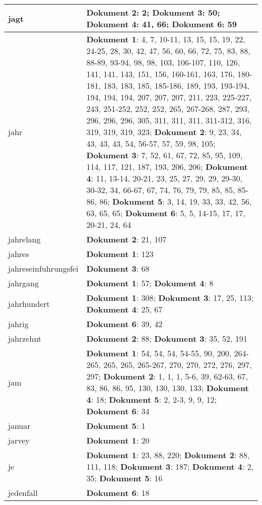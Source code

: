 \documentclass[a5paper]{article}
\begin{document}
\begin{longtable}[l]{|l|p{3in}|}
\hline
jagt & \textbf{Dokument 2}: 2; \textbf{Dokument 3}: 50; \textbf{Dokument 4}: 41, 66; \textbf{Dokument 6}: 59 \\
\hline
jahr & \textbf{Dokument 1}: 4, 7, 10-11, 13, 15, 15, 19, 22, 24-25, 28, 30, 42, 47, 56, 60, 66, 72, 75, 83, 88, 88-89, 93-94, 98, 98, 103, 106-107, 110, 126, 141, 141, 143, 151, 156, 160-161, 163, 176, 180-181, 183, 183, 185, 185-186, 189, 193, 193-194, 194, 194, 194, 207, 207, 207, 211, 223, 225-227, 243, 251-252, 252, 252, 265, 267-268, 287, 293, 296, 296, 296, 305, 311, 311, 311, 311-312, 316, 319, 319, 319, 323; \textbf{Dokument 2}: 9, 23, 34, 43, 43, 43, 54, 56-57, 57, 59, 98, 105; \textbf{Dokument 3}: 7, 52, 61, 67, 72, 85, 95, 109, 114, 117, 121, 187, 193, 206, 206; \textbf{Dokument 4}: 11, 13-14, 20-21, 23, 25, 27, 29, 29, 29-30, 30-32, 34, 66-67, 67, 74, 76, 79, 79, 85, 85, 85-86, 86; \textbf{Dokument 5}: 3, 14, 19, 33, 33, 42, 56, 63, 65, 65; \textbf{Dokument 6}: 5, 5, 14-15, 17, 17, 20-21, 24, 64 \\
\hline
jahrelang & \textbf{Dokument 2}: 21, 107 \\
\hline
jahres & \textbf{Dokument 1}: 123 \\
\hline
jahreseinfuhrungsfei & \textbf{Dokument 3}: 68 \\
\hline
jahrgang & \textbf{Dokument 1}: 57; \textbf{Dokument 4}: 8 \\
\hline
jahrhundert & \textbf{Dokument 1}: 308; \textbf{Dokument 3}: 17, 25, 113; \textbf{Dokument 4}: 25, 67 \\
\hline
jahrig & \textbf{Dokument 6}: 39, 42 \\
\hline
jahrzehnt & \textbf{Dokument 2}: 88; \textbf{Dokument 3}: 35, 52, 191 \\
\hline
jam & \textbf{Dokument 1}: 54, 54, 54, 54-55, 90, 200, 264-265, 265, 265, 265-267, 270, 270, 272, 276, 297, 297; \textbf{Dokument 2}: 1, 1, 1, 5-6, 39, 62-63, 67, 83, 86, 86, 95, 130, 130, 130, 133; \textbf{Dokument 4}: 18; \textbf{Dokument 5}: 2, 2-3, 9, 9, 12; \textbf{Dokument 6}: 34 \\
\hline
januar & \textbf{Dokument 5}: 1 \\
\hline
jarvey & \textbf{Dokument 1}: 20 \\
\hline
je & \textbf{Dokument 1}: 23, 88, 220; \textbf{Dokument 2}: 88, 111, 118; \textbf{Dokument 3}: 187; \textbf{Dokument 4}: 2, 35; \textbf{Dokument 5}: 16 \\
\hline
jedenfall & \textbf{Dokument 6}: 18 \\
\hline

\end{longtable}
\end{document}
